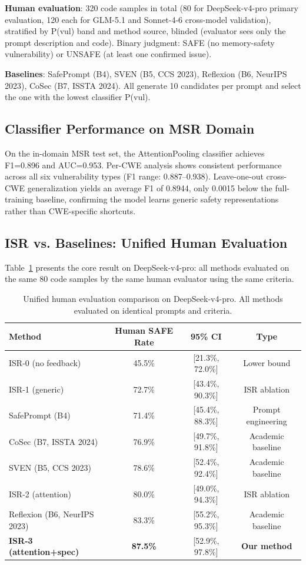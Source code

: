 \documentclass[10pt,conference]{IEEEtran}
\begin{document}
\textbf{Human evaluation}: 320 code samples in total (80 for DeepSeek-v4-pro primary evaluation, 120 each for GLM-5.1 and Sonnet-4-6 cross-model validation), stratified by P(vul) band and method source, blinded (evaluator sees only the prompt description and code). Binary judgment: SAFE (no memory-safety vulnerability) or UNSAFE (at least one confirmed issue).

\textbf{Baselines}: SafePrompt (B4), SVEN (B5, CCS 2023), Reflexion (B6, NeurIPS 2023), CoSec (B7, ISSTA 2024). All generate 10 candidates per prompt and select the one with the lowest classifier P(vul).

\subsection{Classifier Performance on MSR Domain}

On the in-domain MSR test set, the AttentionPooling classifier achieves F1=0.896 and AUC=0.953. Per-CWE analysis shows consistent performance across all six vulnerability types (F1 range: 0.887--0.938). Leave-one-out cross-CWE generalization yields an average F1 of 0.8944, only 0.0015 below the full-training baseline, confirming the model learns generic safety representations rather than CWE-specific shortcuts.

\subsection{ISR vs. Baselines: Unified Human Evaluation}

Table~\ref{tab:unified} presents the core result on DeepSeek-v4-pro: all methods evaluated on the same 80 code samples by the same human evaluator using the same criteria.

\begin{table}
\centering
\caption{Unified human evaluation comparison on DeepSeek-v4-pro. All methods evaluated on identical prompts and criteria.}
\label{tab:unified}
\begin{tabular}{lccc}
\toprule
Method & Human SAFE Rate & 95\% CI & Type \\
\midrule
ISR-0 (no feedback) & 45.5\% & [21.3\%, 72.0\%] & Lower bound \\
ISR-1 (generic) & 72.7\% & [43.4\%, 90.3\%] & ISR ablation \\
SafePrompt (B4) & 71.4\% & [45.4\%, 88.3\%] & Prompt engineering \\
CoSec (B7, ISSTA 2024) & 76.9\% & [49.7\%, 91.8\%] & Academic baseline \\
SVEN (B5, CCS 2023) & 78.6\% & [52.4\%, 92.4\%] & Academic baseline \\
ISR-2 (attention) & 80.0\% & [49.0\%, 94.3\%] & ISR ablation \\
Reflexion (B6, NeurIPS 2023) & 83.3\% & [55.2\%, 95.3\%] & Academic baseline \\
\textbf{ISR-3 (attention+spec)} & \textbf{87.5\%} & [52.9\%, 97.8\%] & \textbf{Our method} \\
\bottomrule
\end{tabular}
\end{table}
\end{document}
